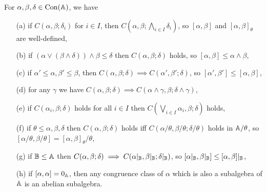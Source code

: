 \documentclass[letterpaper,11pt]{article}
\DeclareMathOperator{\Con}{Con}
\begin{document}
\begin{prop}\label{gen-commutator} For $\alpha,\beta,\delta \in \Con(\bA)$, we have
\begin{itemize}
\item[(a)] if $C(\alpha,\beta;\delta_i)$ for $i \in I$, then $C(\alpha,\beta;\bigwedge_{i\in I} \delta_i)$, so $[\alpha,\beta]$ and $[\alpha,\beta]_\theta$ are well-defined,

\item[(b)] if $(\alpha \vee (\beta \wedge \delta)) \wedge \beta \le \delta$ then $C(\alpha, \beta; \delta)$ holds, so $[\alpha,\beta] \le \alpha \wedge \beta$,

\item[(c)] if $\alpha' \le \alpha, \beta' \le \beta$, then $C(\alpha,\beta;\delta) \implies C(\alpha',\beta';\delta)$, so $[\alpha',\beta'] \le [\alpha, \beta]$,

\item[(d)] for any $\gamma$ we have $C(\alpha,\beta;\delta) \implies C(\alpha\wedge \gamma,\beta;\delta \wedge \gamma)$,

\item[(e)] if $C(\alpha_i,\beta;\delta)$ holds for all $i\in I$ then $C(\bigvee_{i \in I}\alpha_i,\beta;\delta)$ holds,

\item[(f)] if $\theta \le \alpha, \beta, \delta$ then $C(\alpha,\beta;\delta)$ holds iff $C(\alpha/\theta,\beta/\theta;\delta/\theta)$ holds in $\mathbb{A}/\theta$, so $[\alpha/\theta,\beta/\theta] = [\alpha,\beta]_\theta/\theta$,

\item[(g)] if $\mathbb{B} \le \mathbb{A}$ then $C(\alpha,\beta;\delta) \implies C(\alpha|_{\mathbb{B}}, \beta|_{\mathbb{B}}; \delta|_{\mathbb{B}})$, so $[\alpha|_{\mathbb{B}},\beta|_{\mathbb{B}}] \le [\alpha,\beta]|_{\mathbb{B}}$,

\item[(h)] if $[\alpha,\alpha] = 0_{\mathbb{A}}$, then any congruence class of $\alpha$ which is also a subalgebra of $\mathbb{A}$ is an abelian subalgebra.
\end{itemize}
\end{prop}
\end{document}
